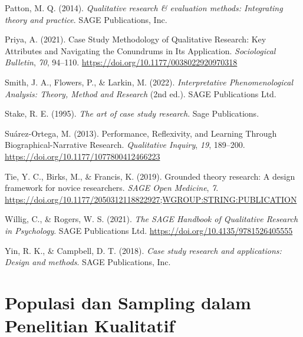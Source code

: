 \documentclass[
  indonesian,
  letterpaper,
  DIV=11,
  numbers=noendperiod]{scrreprt}
\newlength{\cslhangindent}
\newenvironment{CSLReferences}[2] %
 {\begin{list}{}{%
  \setlength{\itemindent}{0pt}
  \setlength{\leftmargin}{0pt}
  \setlength{\parsep}{0pt}
  \ifodd #1
   \setlength{\leftmargin}{\cslhangindent}
   \setlength{\itemindent}{-1\cslhangindent}
  \fi
  \setlength{\itemsep}{#2\baselineskip}}}
 {\end{list}}
\begin{document}
\begin{CSLReferences}{1}{0}
Patton, M. Q. (2014). \emph{Qualitative research \& evaluation methods:
Integrating theory and practice}. SAGE Publications, Inc.

Priya, A. (2021). Case Study Methodology of Qualitative Research: Key
Attributes and Navigating the Conundrums in Its Application.
\emph{Sociological Bulletin}, \emph{70}, 94--110.
\url{https://doi.org/10.1177/0038022920970318}

Smith, J. A., Flowers, P., \& Larkin, M. (2022). \emph{Interpretative
Phenomenological Analysis: Theory, Method and Research} (2nd ed.). SAGE
Publications Ltd.

Stake, R. E. (1995). \emph{The art of case study research}. Sage
Publications.

Suárez-Ortega, M. (2013). Performance, Reflexivity, and Learning Through
Biographical-Narrative Research. \emph{Qualitative Inquiry}, \emph{19},
189--200. \url{https://doi.org/10.1177/1077800412466223}

Tie, Y. C., Birks, M., \& Francis, K. (2019). Grounded theory research:
A design framework for novice researchers. \emph{SAGE Open Medicine},
\emph{7}.
\url{https://doi.org/10.1177/2050312118822927;WGROUP:STRING:PUBLICATION}

Willig, C., \& Rogers, W. S. (2021). \emph{The SAGE Handbook of
Qualitative Research in Psychology}. SAGE Publications Ltd.
\url{https://doi.org/10.4135/9781526405555}

Yin, R. K., \& Campbell, D. T. (2018). \emph{Case study research and
applications: Design and methods}. SAGE Publications, Inc.

\end{CSLReferences}

\chapter{Populasi dan Sampling dalam Penelitian
Kualitatif}\label{populasi-dan-sampling-dalam-penelitian-kualitatif}
\end{document}
